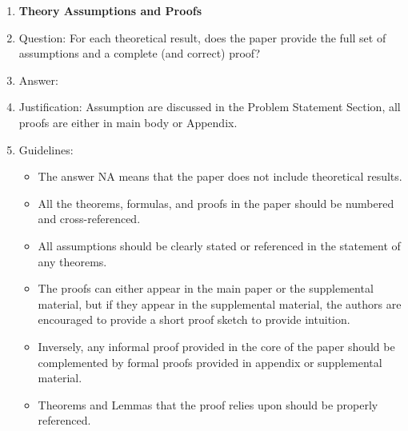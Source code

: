 \documentclass{article}
\theoremstyle{plain}
\theoremstyle{definition}
\theoremstyle{remark}
\theoremstyle{plain}
\begin{document}
\begin{enumerate}
\item {\bf Theory Assumptions and Proofs}
    \item[] Question: For each theoretical result, does the paper provide the full set of assumptions and a complete (and correct) proof?
    \item[] Answer: \answerYes{} %
    \item[] Justification: Assumption are discussed in the Problem Statement Section, all proofs are either in main body or Appendix.
    \item[] Guidelines:
    \begin{itemize}
        \item The answer NA means that the paper does not include theoretical results. 
        \item All the theorems, formulas, and proofs in the paper should be numbered and cross-referenced.
        \item All assumptions should be clearly stated or referenced in the statement of any theorems.
        \item The proofs can either appear in the main paper or the supplemental material, but if they appear in the supplemental material, the authors are encouraged to provide a short proof sketch to provide intuition. 
        \item Inversely, any informal proof provided in the core of the paper should be complemented by formal proofs provided in appendix or supplemental material.
        \item Theorems and Lemmas that the proof relies upon should be properly referenced. 
    \end{itemize}


\end{enumerate}
\end{document}
